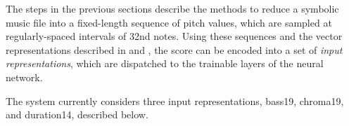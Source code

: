 
The steps in the previous sections describe the methods to
reduce a symbolic music file into a fixed-length sequence of
pitch values, which are sampled at regularly-spaced
intervals of \gls{32nd} notes. Using these sequences and the
vector representations described in
 and
, the score can be encoded into
a set of \emph{input representations}, which are dispatched
to the trainable layers of the neural network. 

The system currently considers three input representations,
\gls{bass19}, \gls{chroma19}, and \gls{duration14},
described below.


